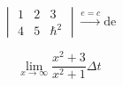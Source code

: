 
\begin{equation}
\begin{vmatrix}1&2&3\\4&5&\hbar^2\end{vmatrix}\xrightarrow{e = c}\mathrm{de}
\end{equation}

\begin{equation}
\lim_{x\to\infty}\frac{x^2+3}{x^2+1} \Delta t
\end{equation}

